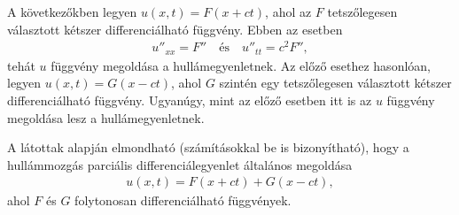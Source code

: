 A következőkben legyen $ u(x,t) = F(x+ct)$, ahol az $ F $ tetszőlegesen választott kétszer differenciálható függvény. Ebben az esetben
\begin{align*}
	u''_{xx} = F'' \quad \textrm{és} \quad u''_{tt} = c^{2}F'',
\end{align*}
tehát $ u $ függvény megoldása a hullámegyenletnek. Az előző esethez hasonlóan, legyen $ u(x,t) = G(x-ct)$, ahol $ G $ szintén egy tetszőlegesen választott kétszer differenciálható függvény. Ugyanúgy, mint az előző esetben itt is az $ u $ függvény megoldása lesz a hullámegyenletnek.

A látottak alapján elmondható (számításokkal be is bizonyítható), hogy a hullámmozgás parciális differenciálegyenlet általános megoldása
\begin{align}
	u(x,t) = F(x+ct)+G(x-ct),
\end{align}
ahol $ F $ és $ G $ folytonosan differenciálható függvények.